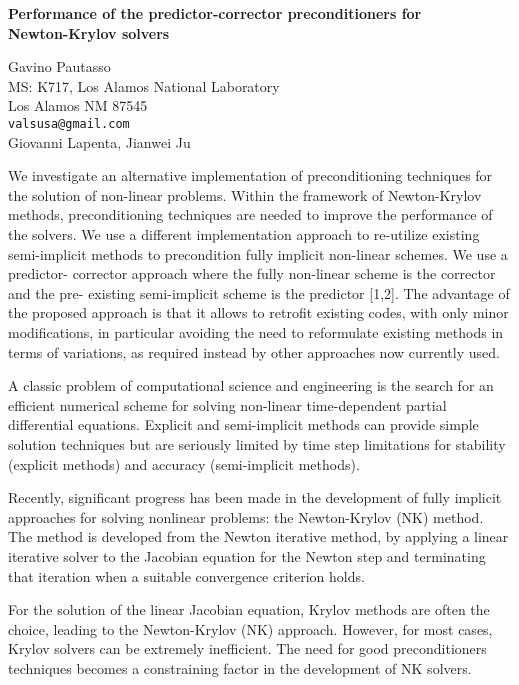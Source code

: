 \documentclass{report}
\begin{document}

\begin{center}
{\large
{\bf Performance of the predictor-corrector preconditioners for \\
	Newton-Krylov solvers}}

	Gavino Pautasso \\
	MS: K717,  Los Alamos National Laboratory \\
	Los Alamos NM 87545 \\
	{\tt valsusa@gmail.com} \\
	Giovanni Lapenta, Jianwei Ju
\end{center}
We investigate an alternative implementation of
preconditioning techniques for the solution of non-linear
problems. Within the framework of Newton-Krylov methods,
preconditioning techniques are needed to improve the
performance of the solvers. We use a different
implementation approach to re-utilize existing semi-implicit
methods to precondition fully implicit non-linear schemes.
We use a predictor- corrector approach where the fully
non-linear scheme is the corrector and the pre- existing
semi-implicit scheme is the predictor [1,2]. The advantage
of the proposed approach is that it allows to retrofit
existing codes, with only minor modifications, in particular
avoiding the need to reformulate existing methods in terms
of variations, as required instead by other approaches now
currently used.

A classic problem of computational
science and engineering is the search for an efficient
numerical scheme for solving non-linear time-dependent
partial differential equations. Explicit and semi-implicit
methods can provide simple solution techniques but are
seriously limited by time step limitations for stability
(explicit methods) and accuracy (semi-implicit methods).


Recently, significant progress has been made in the
development of fully implicit approaches for solving
nonlinear problems: the Newton-Krylov (NK) method. The
method is developed from the Newton iterative method, by
applying a linear iterative solver to the Jacobian equation
for the Newton step and terminating that iteration when a
suitable convergence criterion holds.

For the solution of
the linear Jacobian equation, Krylov methods are often the
choice, leading to the Newton-Krylov (NK) approach. However,
for most cases, Krylov solvers can be extremely inefficient.
The need for good preconditioners techniques becomes a
constraining factor in the development of NK solvers.
\end{document}
